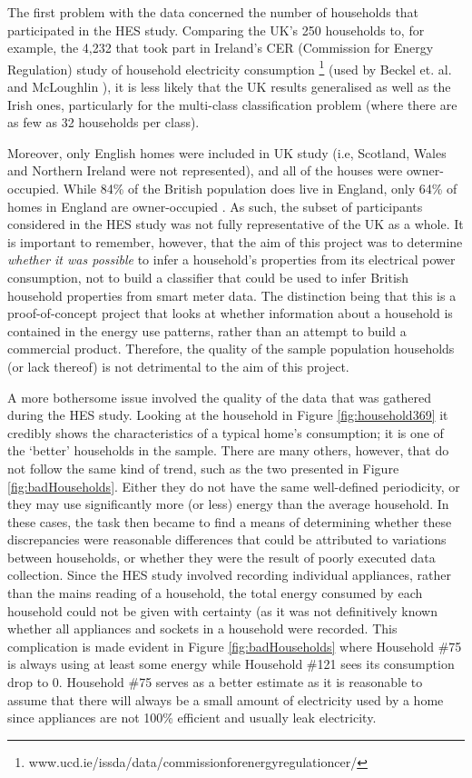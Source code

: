 The first problem with the data concerned the number of households that participated in the HES study.  Comparing the UK's 250 households to, for example, the 4,232 that took part in Ireland's CER (Commission for Energy Regulation) study of household electricity consumption \footnote{www.ucd.ie/issda/data/commissionforenergyregulationcer/} (used by  Beckel et. al. and McLoughlin \cite{Beckel_1,Beckel_2,Beckel_3,McLoughlin}),  it is less likely that the UK results generalised as well as the Irish ones, particularly for the multi-class classification problem (where there are as few as 32 households per class). 

Moreover, only English homes were included in UK study (i.e, Scotland, Wales and Northern Ireland were not represented), and all of the houses were owner-occupied.  While 84\% of the British population does live in England, only 64\% of homes in England are owner-occupied \cite{ONS}. As such, the subset of participants considered in the HES study was not fully representative of the UK as a whole. It is important to remember, however, that the aim of this project was to determine \textit{whether it was possible} to infer a household's properties from its electrical power consumption, not to build a classifier that could be used to infer British household properties from smart meter data. The distinction being that this is a proof-of-concept project that looks at whether information about a household is contained in the energy use patterns, rather than an attempt to build a commercial product. Therefore, the quality of the sample population households (or lack thereof) is not detrimental to the aim of this project.

A more bothersome issue involved the quality of the data that was gathered during the HES study. Looking at the household in Figure \ref{fig:household369} it credibly shows the characteristics of a typical home's consumption; it is one of the `better' households in the sample. There are many others, however, that do not follow the same kind of trend, such as the two presented in Figure \ref{fig:badHouseholds}. Either they do not have the same well-defined periodicity, or they may use significantly more (or less) energy than the average household. In these cases, the task then became to find a means of determining whether these discrepancies were reasonable differences that could be attributed to variations between households, or whether they were the result of poorly executed data collection. Since the HES study involved recording individual appliances, rather than the mains reading of a household, the total energy consumed by each household could not be given with certainty (as it was not definitively known whether all appliances and sockets in a household were recorded. This complication is made evident in Figure \ref{fig:badHouseholds} where Household \#75 is always using at least some energy while Household \#121 sees its consumption drop to 0. Household \#75 serves as a better estimate as it is reasonable to assume that there will always be a small amount of electricity used by a home since appliances are not 100\% efficient and usually leak electricity.


